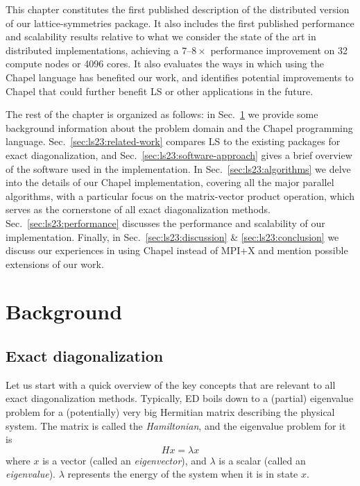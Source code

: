 This chapter constitutes the first published description of the distributed version of our lattice-symmetries package. It also includes the first published performance and scalability results relative to what we consider the state of the art in distributed implementations, achieving a $7$--$8\times$ performance improvement on 32 compute nodes or 4096 cores. It also evaluates the ways in which using the Chapel language has benefited our work, and identifies potential improvements to Chapel that could further benefit LS or other applications in the future.

The rest of the chapter is organized as follows: in Sec.~\ref{sec:ls23:background} we provide some background information about the problem domain and the Chapel programming language. Sec.~\ref{sec:ls23:related-work} compares LS to the existing packages for exact diagonalization, and Sec.~\ref{sec:ls23:software-approach} gives a brief overview of the software used in the implementation. In Sec.~\ref{sec:ls23:algorithms} we delve into the details of our Chapel implementation, covering all the major parallel algorithms, with a particular focus on the matrix-vector product operation, which serves as the cornerstone of all exact diagonalization methods. Sec.~\ref{sec:ls23:performance} discusses the performance and scalability of our implementation. Finally, in Sec.~\ref{sec:ls23:discussion} \& \ref{sec:ls23:conclusion} we discuss our experiences in using Chapel instead of MPI+X and mention possible extensions of our work.

\section{Background}\label{sec:ls23:background}

\subsection{Exact diagonalization}

Let us start with a quick overview of the key concepts that are relevant to all exact diagonalization methods. Typically, ED boils down to a (partial) eigenvalue problem for a (potentially) very big Hermitian matrix describing the physical system. The matrix is called the \emph{Hamiltonian}, and the eigenvalue problem for it is
\begin{equation*}
  H x = \lambda x
\end{equation*}
where $x$ is a vector (called an \emph{eigenvector}), and $\lambda$ is a scalar (called an \emph{eigenvalue}). $\lambda$ represents the energy of the system when it is in state $x$.
 
